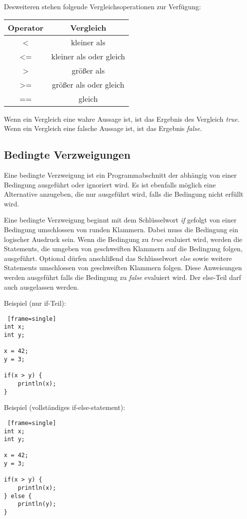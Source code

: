 Desweiteren stehen folgende Vergleichsoperationen zur Verfügung:
\begin{center}
  \begin{tabular}{ | c | c | }
    \hline
    Operator & Vergleich\\ \hline \hline
    < & kleiner als\\ \hline
    <= & kleiner als oder gleich\\ \hline
    > & größer als\\ \hline
    >= & größer als oder gleich\\ \hline    
    == & gleich\\ \hline    
  \end{tabular}
\end{center}
Wenn ein Vergleich eine wahre Aussage ist, ist das Ergebnis des Vergleich \textit{true}.
Wenn ein Vergleich eine falsche Aussage ist, ist das Ergebnis \textit{false}.

\subsection{Bedingte Verzweigungen}
Eine bedingte Verzweigung ist ein Programmabschnitt der abhängig von einer Bedingung ausgeführt oder ignoriert wird. Es ist ebenfalls möglich eine Alternative anzugeben, die nur ausgeführt wird, falls die Bedingung nicht erfüllt wird.

Eine bedingte Verzweigung beginnt mit dem Schlüsselwort \textit{if} gefolgt von einer Bedingung umschlossen von runden Klammern. Dabei muss die Bedingung ein logischer Ausdruck sein. Wenn die Bedingung zu \textit{true} evaluiert wird, werden die Statements, die umgeben von geschweiften Klammern auf die Bedingung folgen, ausgeführt. 
Optional dürfen anschlißend das Schlüsselwort \textit{else} sowie weitere Statements umschlossen von geschweiften Klammern folgen. Diese Anweisungen werden ausgeführt falls die Bedingung zu \textit{false} evaluiert wird. Der else-Teil darf auch ausgelassen werden.

Beispiel (nur if-Teil):
\begin{lstlisting} [frame=single] 
int x;
int y;

x = 42;
y = 3;

if(x > y) {
	println(x);
} 
\end{lstlisting}

Beispiel (vollständiges if-else-statement):
\begin{lstlisting} [frame=single] 
int x;
int y;

x = 42;
y = 3;

if(x > y) {
	println(x);
} else {
	println(y);
}
\end{lstlisting}

